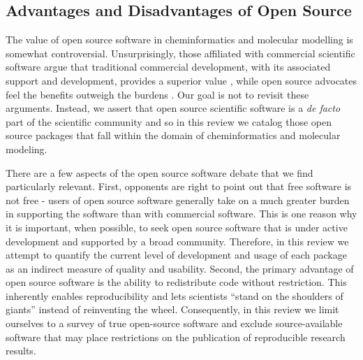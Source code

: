 \subsection*{Advantages and Disadvantages of Open Source}

The value of open source software in cheminformatics and molecular modelling is somewhat controversial.  Unsurprisingly, those affiliated with commercial scientific software argue that traditional commercial development, with its associated support and development, provides a superior value \cite{Krylov_2015}, while open source advocates feel the benefits outweigh the burdens \cite{Gezelter_2015,Jacob_2016}. Our goal is not to revisit these arguments.  Instead, we assert that open source scientific software is a \textit{de facto} part of the scientific community and so in this review we catalog those open source packages that fall within the domain of cheminformatics and molecular modeling.

There are a few aspects of the open source software debate that we find particularly relevant.  First, opponents are right to point out that free software is not free - users of open source software generally take on a much greater burden in supporting the software than with commercial software.  This is one reason why it is important, when possible, to seek open source software that is under active development and supported by a broad community.  Therefore, in this review we attempt to quantify the current level of development and usage of each package as an indirect measure of quality and usability.  Second, the primary advantage of open source software is the ability to redistribute code without restriction.  This inherently enables reproducibility and lets scientists ``stand on the shoulders of giants'' instead of reinventing the wheel. Consequently, in this review we limit ourselves to a survey of true open-source software and exclude source-available software that may place restrictions on the publication of reproducible research results. 


